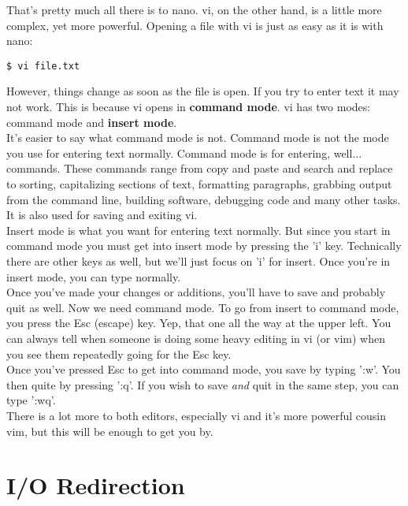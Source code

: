 That's pretty much all there is to nano.  vi, on the other hand, is a little more complex, yet more powerful.  Opening a file with vi is just as easy as it is with nano:

\begin{verbatim}
$ vi file.txt
\end{verbatim}

However, things change as soon as the file is open.  If you try to enter text it may not work.  This is because vi opens in \textbf{command mode}.  vi has two modes: command mode and \textbf{insert mode}.\\

It's easier to say what command mode is not.  Command mode is not the mode you use for entering text normally.  Command mode is for entering, well... commands.  These commands range from copy and paste and search and replace to sorting, capitalizing sections of text, formatting paragraphs, grabbing output from the command line, building software, debugging code and many other tasks.  It is also used for saving and exiting vi.\\

Insert mode is what you want for entering text normally.  But since you start in command mode you must get into insert mode by pressing the 'i' key.  Technically there are other keys as well, but we'll just focus on 'i' for insert.  Once you're in insert mode, you can type normally.\\

Once you've made your changes or additions, you'll have to save and probably quit as well.  Now we need command mode.  To go from insert to command mode, you press the Esc (escape) key.  Yep, that one all the way at the upper left.  You can always tell when someone is doing some heavy editing in vi (or vim) when you see them repeatedly going for the Esc key.\\

Once you've pressed Esc to get into command mode, you save by typing ':w'.  You then quite by pressing ':q'.  If you wish to save \textit{and} quit in the same step, you can type ':wq'.\\

There is a lot more to both editors, especially vi and it's more powerful cousin vim, but this will be enough to get you by.

\section{I/O Redirection}

